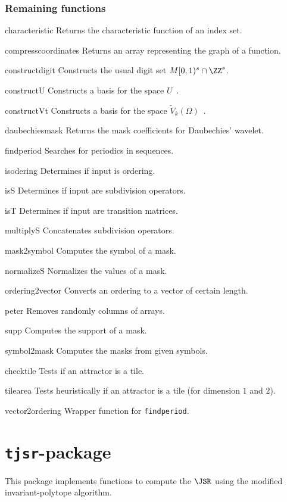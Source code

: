 \subsubsection{Remaining functions}
\begin{param}
\item[characteristic] Returns the characteristic function of an index set.
\item[compresscoordinates] Returns an array representing the graph of a function.
\item[constructdigit] Constructs the usual digit set $M[0,1)^s\cap \ZZ^s$. 
\item[constructU] Constructs a basis for the space $U$~\cite{CP17}.
\item[constructVt] Constructs a basis for the space $\tilde{V}_k(\Omega)$~\cite{CM18}.
\item[daubechiesmask] Returns the mask coefficients for Daubechies' wavelet.
\item[findperiod] Searches for periodics in sequences.
\item[isodering] Determines if input is {ordering}.
\item[isS] Determines if input are {subdivision operator}s.
\item[isT] Determines if input are transition matrices.
\item[multiplyS] Concatenates subdivision operators.
\item[mask2symbol] Computes the symbol of a mask.
\item[normalizeS] Normalizes the values of a mask.
\item[ordering2vector] Converts an ordering to a vector of certain length.
\item[peter] Removes randomly columns of arrays.
\item[supp] Computes the support of a mask.
\item[symbol2mask] Computes the masks from given symbols.
\item[checktile] Tests if an attractor is a tile.
\item[tilearea] Tests heuristically if an attractor is a tile (for dimension $1$ and $2$).
\item[vector2ordering] Wrapper function for \texttt{findperiod}.
\end{param}



\section{\texttt{tjsr}-package}\label{tjsr_package}
This package implements functions to compute the $\JSR$ using the modified invariant-polytope algorithm.

